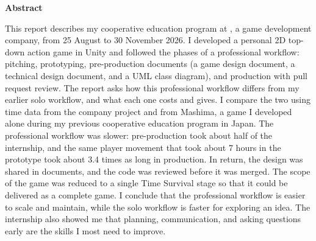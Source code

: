 \newpage
{}
\renewcommand{\thepage}{(1)}

\begin{center}
    {\bfseries Abstract \par}
\end{center}
\vspace{1em}

\noindent
This report describes my cooperative education program at \companyName{}, a game development company, from 25 August to 30 November 2026. I developed a personal 2D top-down action game in Unity and followed the phases of a professional workflow: pitching, prototyping, pre-production documents (a game design document, a technical design document, and a UML class diagram), and production with pull request review.
The report asks how this professional workflow differs from my earlier solo workflow, and what each one costs and gives.
I compare the two using time data from the company project and from Mashima, a game I developed alone during my previous cooperative education program in Japan.
The professional workflow was slower: pre-production took about half of the internship, and the same player movement that took about 7 hours in the prototype took about 3.4 times as long in production.
In return, the design was shared in documents, and the code was reviewed before it was merged.
The scope of the game was reduced to a single Time Survival stage so that it could be delivered as a complete game.
I conclude that the professional workflow is easier to scale and maintain, while the solo workflow is faster for exploring an idea.
The internship also showed me that planning, communication, and asking questions early are the skills I most need to improve.